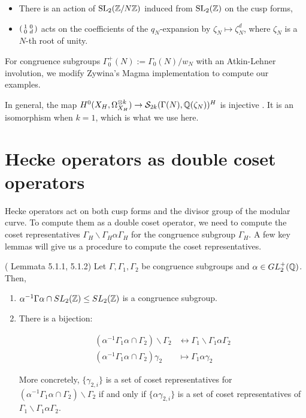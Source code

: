 \begin{itemize}
    \item There is an action of $\operatorname{SL}_2(\mathbb{Z}/N\mathbb{Z})$ induced from $\operatorname{SL}_2(\mathbb{Z})$ on the cusp forms,
    \item $\begin{psmallmatrix} 1 & 0 \\ 0 & d \end{psmallmatrix}$ acts on the coefficients of the $q_N$-expansion by $\zeta_N \mapsto \zeta_N^d$, where $\zeta_N$ is a $N$-th root of unity. 
\end{itemize}

For congruence subgroups $\Gamma_0^+(N) := \Gamma_0(N)/w_N$ with an Atkin-Lehner involution, we modify Zywina's Magma implementation to compute our examples.

\begin{remark}
In general, the map $H^0(X_H, \Omega_{X_H}^{\otimes k}) \rightarrow \mathcal{S}_{2k}(\Gamma(N),\mathbb{Q}(\zeta_N))^H$ is injective \cite{Zywina2020ComputingAO}. It is an isomorphism when $k = 1$, which is what we use here.
\end{remark}

\section{Hecke operators as double coset operators}

Hecke operators act on both cusp forms and the divisor group of the modular curve. To compute them as a double coset operator, we need to compute the coset representatives $\Gamma_H \backslash \Gamma_H \alpha \Gamma_H$ for the congruence subgroup $\Gamma_H$. A few key lemmas will give us a procedure to compute the coset representatives.

\begin{lemma}{(\cite{Shurman} Lemmata 5.1.1, 5.1.2)}\label{lemma:coset_rep}
Let $\Gamma, \Gamma_1, \Gamma_2$ be congruence subgroups and  $\alpha \in GL_2^+(\mathbb{Q})$. Then,

\begin{enumerate}
    \item $\alpha^{-1} \Gamma \alpha \cap SL_2(\mathbb{Z}) \leq SL_2(\mathbb{Z})$ is a congruence subgroup.
    \item There is a bijection:

    \begin{align*}
        (\alpha^{-1} \Gamma_1 \alpha \cap \Gamma_2 )\backslash \Gamma_2 &\leftrightarrow \Gamma_1 \backslash \Gamma_1 \alpha \Gamma_2 \\
         (\alpha^{-1} \Gamma_1 \alpha \cap \Gamma_2 )\gamma_2 &\mapsto \Gamma_1 \alpha \gamma_2
    \end{align*}

    More concretely, $\{\gamma_{2,i}\}$ is a set of coset representatives for $(\alpha^{-1} \Gamma_1 \alpha \cap \Gamma_2 )\backslash \Gamma_2$ if and only if $\{\alpha \gamma_{2,i}\}$ is a set of coset representatives of $\Gamma_1 \backslash \Gamma_1 \alpha \Gamma_2$.
\end{enumerate}
\end{lemma}

